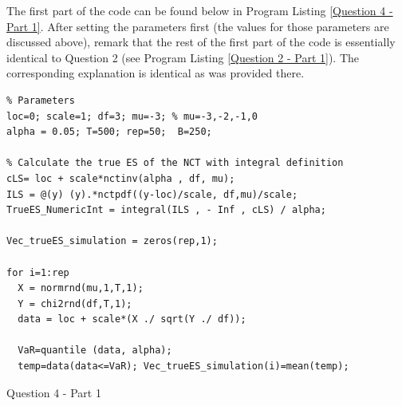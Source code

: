 \documentclass[12pt]{article}
\begin{document}
The first part of the code can be found below in Program Listing \ref{Question 4 - Part 1}.
After setting the parameters first (the values for those parameters are discussed above), remark that the rest of the first part of the code is essentially identical to Question 2 (see Program Listing \ref{Question 2 - Part 1}). The corresponding explanation is identical as was provided there. 

\begin{Program}[!htb]
\begin{lstlisting}[style=Matlab-editor,basicstyle=\mlttfamily\footnotesize]
%% Question 4 - Part 1 --------------------------------------------------
% Parameters
loc=0; scale=1; df=3; mu=-3; % mu=-3,-2,-1,0
alpha = 0.05; T=500; rep=50;  B=250;
    
% Calculate the true ES of the NCT with integral definition
cLS= loc + scale*nctinv(alpha , df, mu); 
ILS = @(y) (y).*nctpdf((y-loc)/scale, df,mu)/scale; 
TrueES_NumericInt = integral(ILS , - Inf , cLS) / alpha; 

Vec_trueES_simulation = zeros(rep,1);

for i=1:rep
  X = normrnd(mu,1,T,1); 
  Y = chi2rnd(df,T,1);
  data = loc + scale*(X ./ sqrt(Y ./ df)); 
  
  VaR=quantile (data, alpha); 
  temp=data(data<=VaR); Vec_trueES_simulation(i)=mean(temp); 
\end{lstlisting}
\caption{Question 4 - Part 1}
\label{Question 4 - Part 1}
\end{Program}
\newpage
\end{document}
